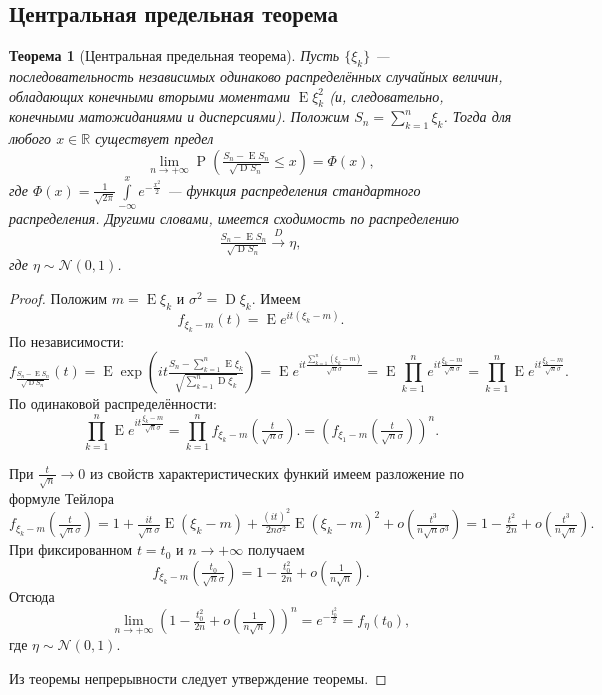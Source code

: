 \documentclass[12pt]{article}
\newtheorem{theorem}{Теорема}
\numberwithin{theorem}{section}
\theoremstyle{definition}
\newcommand{\RR}{\mathbb{R}}
\newcommand{\prob}{\operatorname{P}}
\newcommand{\expect}{\operatorname{E}}
\newcommand{\disp}{\operatorname{D}}
\begin{document}
	\subsection{Центральная предельная теорема}
	
	\begin{theorem}[Центральная предельная теорема]
		Пусть $ \{\xi_k\} $ --- последовательность независимых одинаково распределённых случайных величин,
		обладающих конечными вторыми моментами $ \expect\xi_k^2 $ (и, следовательно, конечными матожиданиями и дисперсиями).
		Положим $ S_n = \sum\limits_{k = 1}^{n} \xi_k $.
		Тогда для любого $ x \in \RR $ существует предел
		$$ \lim\limits_{n \to +\infty} \prob(\tfrac{S_n - \expect S_n}{\sqrt{\disp S_n}} \leqslant x) = \Phi(x), $$
		где $ \Phi(x) = \tfrac{1}{\sqrt{2\pi}}\int\limits_{-\infty}^{x} e^{-\tfrac{x^2}{2}} $
		--- функция распределения стандартного распределения.
		Другими словами, имеется сходимость по распределению
		$$ \tfrac{S_n - \expect S_n}{\sqrt{\disp S_n}} \overset{D}{\to} \eta, $$
		где $ \eta \sim \mathcal{N}(0, 1) $.
	\end{theorem}
	
	\begin{proof}
		Положим $ m = \expect\xi_k $ и $ \sigma^2 = \disp\xi_k $.
		Имеем
		$$ f_{\xi_k - m}(t) = \expect e^{it(\xi_k - m)}. $$ 
		По независимости: 
		$$ f_{\tfrac{S_n - \expect S_n}{\sqrt{\disp S_n}}}(t)
		= \expect \exp\left(it{\tfrac{S_n - \sum\limits_{k = 1}^{n} \expect\xi_k}{\sqrt{\sum\limits_{k = 1}^{n} \disp\xi_k}}}\right)
		= \expect e^{it\tfrac{\sum\limits_{k = 1}^{n} (\xi_k - m) }{\sqrt{n}\sigma}}
		= \expect \prod\limits_{k = 1}^{n} e^{it\tfrac{\xi_k - m}{\sqrt{n}\sigma}}
		= \prod\limits_{k = 1}^{n} \expect e^{it\tfrac{\xi_k - m}{\sqrt{n}\sigma}}. $$
		По одинаковой распределённости:
		$$ \prod\limits_{k = 1}^{n} \expect e^{it\tfrac{\xi_k - m}{\sqrt{n}\sigma}} 
		= \prod\limits_{k = 1}^{n} f_{\xi_k - m}(\tfrac{t}{\sqrt{n}\sigma}).
		= \left(f_{\xi_1 - m}(\tfrac{t}{\sqrt{n}\sigma})\right)^n. $$
		
		При $ \tfrac{t}{\sqrt{n}} \to 0 $ из свойств характеристических функий имеем разложение по формуле Тейлора
		$$ f_{\xi_k - m}(\tfrac{t}{\sqrt{n}\sigma}) = 1 + \tfrac{it}{\sqrt{n}\sigma}\expect(\xi_k - m)
		+ \tfrac{(it)^2}{2n\sigma^2}\expect(\xi_k - m)^2 + o(\tfrac{t^3}{n\sqrt{n}\sigma^3})
		= 1 - \tfrac{t^2}{2n} + o(\tfrac{t^3}{n\sqrt{n}}). $$
		При фиксированном $ t = t_0 $ и $ n \to +\infty $ получаем
		$$ f_{\xi_k - m}(\tfrac{t_0}{\sqrt{n}\sigma}) = 1 - \tfrac{t_0^2}{2n} + o(\tfrac{1}{n\sqrt{n}}). $$
		Отсюда
		$$ \lim\limits_{n \to +\infty} \left(1 - \tfrac{t_0^2}{2n} + o(\tfrac{1}{n\sqrt{n}})\right)^n
		= e^{-\tfrac{t_0^2}{2}} = f_{\eta}(t_0), $$
		где $ \eta \sim \mathcal{N}(0, 1) $.
		
		Из теоремы непрерывности следует утверждение теоремы.
	\end{proof}
	
\end{document}
